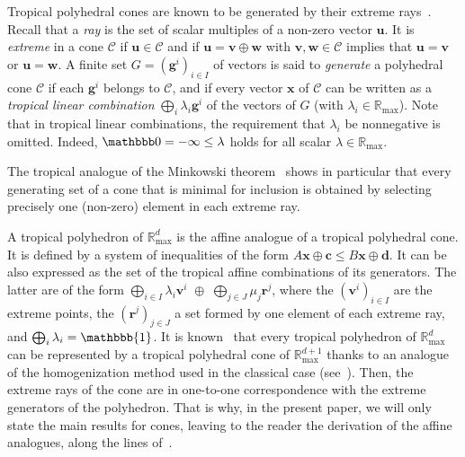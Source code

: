 \documentclass[proceedings]{stacs}
\newcommand{\mpplus}{\oplus}
\newcommand{\maxplus}{\mathbb{R}_{\max}}
\newcommand{\mpone}{\mathbbb{1}}
\newcommand{\mpsum}{\mathop{\bigoplus}}
\newcommand{\vect}[1]{\boldsymbol #1}
\newcommand{\CC}{\mathcal{C}}
\begin{document}
Tropical polyhedral cones are known to be generated by their extreme rays~\cite{GK06a,GK,BSS}. 
Recall that a {\em ray} is the set of scalar multiples of a non-zero vector $\vect u$. It is {\em extreme} in a cone $\CC$ if $\vect u\in \CC$ and if $\vect u=\vect v \mpplus \vect w$ with $\vect v,\vect w\in \CC$ implies that $\vect u=\vect v$ or $\vect u=\vect w$. A finite set $G = (\vect{g}^i)_{i \in I}$ of vectors is said to {\em generate} a polyhedral cone $\CC$ if each
$\vect{g}^i$ belongs to $\CC$, and if every vector $\vect{x}$ of $\CC$
can be written as a \emph{tropical linear combination} $\mpsum_i \lambda_i \vect{g}^i$ of the vectors
of $G$ (with $\lambda_i \in \maxplus$). Note that in tropical linear combinations, the requirement that $\lambda_i$ be nonnegative is omitted. Indeed, $\mpzero =-\infty\leq \lambda$ holds for all scalar $\lambda\in \maxplus$.

The tropical analogue of the Minkowski theorem~\cite{GK,BSS} shows in particular that every generating set of a cone that is minimal for inclusion is obtained by selecting precisely one (non-zero) element in each extreme ray. 




A tropical polyhedron of $\maxplus^d$ is the affine analogue of a tropical polyhedral cone. It is defined by a system of inequalities of the form $A\vect x\oplus \vect{c}\leq B\vect x\oplus \vect{d}$. It can be also expressed as the set of the tropical affine combinations of its generators. The latter are of the form $\mpsum_{i \in I} \lambda_i  \vect{v}^i \,\, \mpplus \,\, \mpsum_{j \in J} \mu_j \vect{r}^j$, where the $(\vect{v}^i)_{i \in I}$ are the extreme points, the $(\vect{r}^j)_{j \in J}$ a set formed by one element of each extreme ray, and $\mpsum_i \lambda_i = \mpone$.
It is known~\cite{cgq02,GK} that every tropical polyhedron of $\maxplus^d$ can be represented by a tropical polyhedral cone of $\maxplus^{d+1}$ thanks to an analogue of the homogenization method used in the classical case (see~\cite[Sect.~1.5]{ziegler98}). Then, the extreme rays of the cone are in one-to-one correspondence with the extreme generators of the polyhedron. That is why, in the present paper, we will only state the main results for cones, leaving to the reader the derivation of the affine analogues, along the lines of~\cite{GK}.
\end{document}
